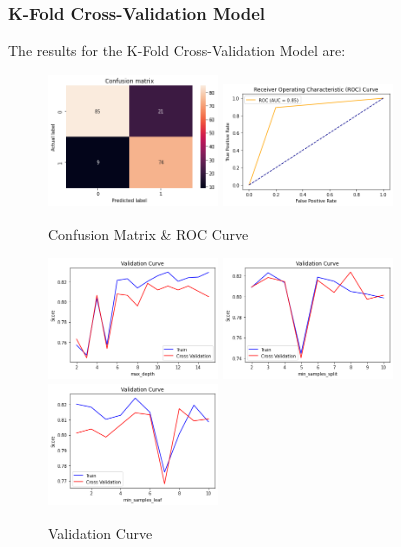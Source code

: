 \documentclass[conference]{IEEEtran}
\begin{document}
\subsubsection{K-Fold Cross-Validation Model}

The results for the K-Fold Cross-Validation Model are:

\begin{figure}[h!]
    \includegraphics[width=4.5cm]{DT/dt3_1.png}%
    \includegraphics[width=4.5cm]{DT/dt3_2.png}%
    \caption{Confusion Matrix & ROC Curve}%
    \label{fig:conf_DT_3}%
\end{figure}

\begin{figure}[h!]
    \centering
    \includegraphics[width=4.5cm]{DT/dt4_1.png}
    \includegraphics[width=4.5cm]{DT/dt4_2.png}
    \includegraphics[width=4.5cm]{DT/dt4_3.png}
    \caption{Validation Curve}
    \label{img:validationCurveDT}
\end{figure}
\end{document}
